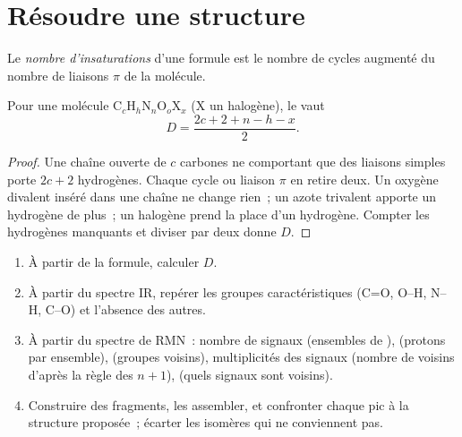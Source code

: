 \section{Résoudre une structure}

\begin{definition}\label{def:b1:structure-spectroscopy:unsaturation}
Le \emph{nombre d'insaturations} d'une
formule est le nombre de cycles augmenté du nombre de liaisons $\pi$ de
la molécule.
\end{definition}

\begin{proposition}\label{prop:b1:structure-spectroscopy:unsaturation-formula}
Pour une molécule $\mathrm{C}_c\mathrm{H}_h\mathrm{N}_n\mathrm{O}_o\mathrm{X}_x$
(X un halogène), le  vaut
\[
  D = \frac{2c + 2 + n - h - x}{2} .
\]
\end{proposition}

\begin{proof}
Une chaîne ouverte de $c$ carbones ne comportant que des liaisons simples
porte $2c + 2$ hydrogènes. Chaque cycle ou liaison $\pi$ en retire deux.
Un oxygène divalent inséré dans une chaîne ne change rien~; un azote
trivalent apporte un hydrogène de plus~; un halogène prend la place d'un
hydrogène. Compter les hydrogènes manquants et diviser par deux donne
$D$.
\end{proof}

\begin{method}\label{met:b1:structure-spectroscopy:solve-structure}
\begin{enumerate}
  \item À partir de la formule, calculer $D$.
  \item À partir du spectre IR, repérer les groupes caractéristiques
        (C=O, O--H, N--H, C--O) et l'absence des autres.
  \item À partir du spectre de RMN~: nombre de signaux (ensembles de
        ),  (protons par ensemble),
         (groupes voisins), multiplicités des
        signaux (nombre de voisins d'après la règle des $n + 1$),
         (quels signaux sont voisins).
  \item Construire des fragments, les assembler, et confronter chaque
        pic à la structure proposée~; écarter les isomères qui ne
        conviennent pas.
\end{enumerate}
\end{method}

